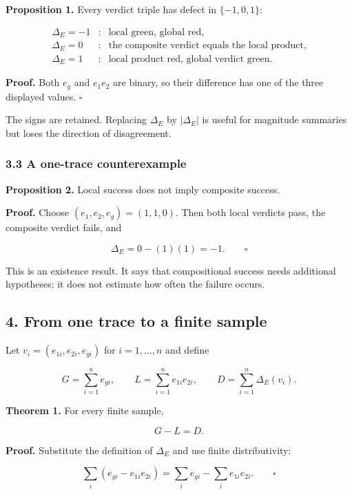 \documentclass[
  11pt,
]{article}
\theoremstyle{plain}
\theoremstyle{definition}\newtheorem{definition}[theorem]{Definition}
\theoremstyle{remark}\newtheorem*{remark}{Remark}
\begin{document}
\textbf{Proposition 1.} Every verdict triple has defect in
\(\{-1,0,1\}\):

\[
\begin{array}{ccl}
\Delta_E=-1 &:& \text{local green, global red},\\
\Delta_E=0  &:& \text{the composite verdict equals the local product},\\
\Delta_E=1  &:& \text{local product red, global verdict green}.
\end{array}
\]

\textbf{Proof.} Both \(e_g\) and \(e_1e_2\) are binary, so their difference has one of
the three displayed values. \(\square\)

The signs are retained. Replacing \(\Delta_E\) by \(|\Delta_E|\) is useful for
magnitude summaries but loses the direction of disagreement.

\subsubsection{3.3 A one-trace counterexample}\label{a-one-trace-counterexample}

\textbf{Proposition 2.} Local success does not imply composite success.

\textbf{Proof.} Choose \((e_1,e_2,e_g)=(1,1,0)\). Then both local verdicts pass, the
composite verdict fails, and

\[
\Delta_E=0-(1)(1)=-1.
\qquad\square
\]

This is an existence result. It says that compositional success needs
additional hypotheses; it does not estimate how often the failure occurs.

\subsection{4. From one trace to a finite sample}\label{from-one-trace-to-a-finite-sample}

Let \(v_i=(e_{1i},e_{2i},e_{gi})\) for \(i=1,\ldots,n\) and define

\[
G=\sum_{i=1}^n e_{gi},\qquad
L=\sum_{i=1}^n e_{1i}e_{2i},\qquad
D=\sum_{i=1}^n\Delta_E(v_i).
\]

\textbf{Theorem 1.} For every finite sample,

\[
G-L=D.
\]

\textbf{Proof.} Substitute the definition of \(\Delta_E\) and use finite
distributivity:

\[
\sum_i(e_{gi}-e_{1i}e_{2i})
=\sum_i e_{gi}-\sum_i e_{1i}e_{2i}.
\qquad\square
\]
\end{document}
